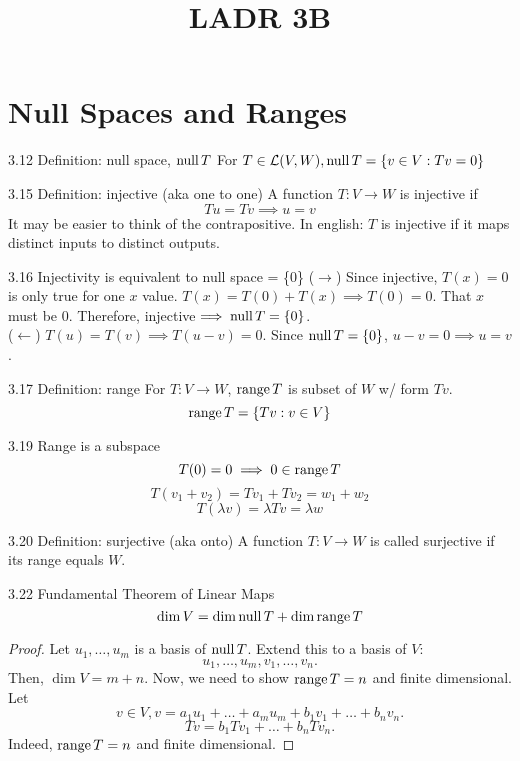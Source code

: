 \documentclass[12pt, letterpaper]{article}
\title{LADR 3B}
\begin{document}
\maketitle

\section*{Null Spaces and Ranges}

\begin{imp}
{3.12 Definition: null space, $\operatorname{null} T$}
For $T\in\mathcal{L}(V,W),\operatorname{null} T=\{v\in V:Tv=0\}$
\end{imp}

\begin{imp}
{3.15 Definition: injective (aka one to one)}
A function $T:V\to W$ is injective if 
$$Tu=Tv\implies u=v$$
It may be easier to think of the contrapositive. 
In english: $T$ is injective
if it maps distinct inputs to distinct outputs.
\end{imp}

\begin{imp}
{3.16 Injectivity is equivalent to null space = \{0\}}
($\rightarrow$)
Since injective, $T(x)=0$ is only true for one $x$ value.
$T(x)=T(0)+T(x)\implies T(0)=0$. That $x$ must be 0.
Therefore, injective$\implies \operatorname{null} T=\{0\}$.
\\($\leftarrow$)
$T(u)=T(v)\implies T(u-v)=0$.
Since $\operatorname{null} T=\{0\}$, $u-v=0\implies u=v$.
\end{imp}

\begin{imp}
{3.17 Definition: range}
For $T:V\to W$, $\operatorname{range} T$ is subset of $W$
w/ form $Tv$.
$$\operatorname{range} T=\{Tv:v\in V\}$$
\end{imp}

\begin{imp}
{3.19 Range is a subspace}
$$T(0)=0\implies 0\in \operatorname{range} T$$
$$T(v_1+v_2) = Tv_1+Tv_2 = w_1+w_2$$
$$T(\lambda v)=\lambda Tv=\lambda w$$
\end{imp}

\begin{imp}
{3.20 Definition: surjective (aka onto)}
A function $T:V\to W$ is called surjective 
if its range equals $W$.
\end{imp}

\begin{imp}
{3.22 Fundamental Theorem of Linear Maps}
$$\dim V=\dim\operatorname{null} T+\dim\operatorname{range} T$$
\begin{proof}
Let $u_1,\dots,u_m$ is a basis of $\operatorname{null} T$.
Extend this to a basis of $V$: 
$$u_1,\dots,u_m,v_1,\dots,v_n.$$
Then, $\dim V=m+n$. Now, we need to show $\operatorname{range} T=n$ and finite dimensional.
Let $$v\in V, v=a_1u_1+\dots+a_mu_m+b_1v_1+\dots+b_nv_n.$$ 
$$Tv=b_1Tv_1+\dots+b_nTv_n.$$
Indeed, $\operatorname{range} T=n$ and finite dimensional.
\end{proof}
\end{imp}
\end{document}
